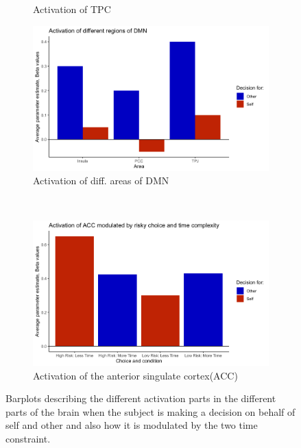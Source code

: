 \documentclass[11pt]{article}
\begin{document}
\begin{figure}
\begin{subfigure}[b]{0.4\textwidth}
    \caption{Activation of TPC                    }
    \label{fig:3c}
  \end{subfigure}
  \begin{subfigure}[b]{0.4\textwidth}
    \includegraphics[width=\textwidth]{figures/dmn.png}
    \caption{Activation of diff. areas of DMN}
    \label{fig:3d}
  \end{subfigure}\\
  \begin{subfigure}[b]{0.4\textwidth}
    \includegraphics[width=\textwidth]{figures/acc.png}
    \caption{Activation of the anterior singulate cortex(ACC)}
    \label{fig:3e}
  \end{subfigure}
  \caption{Barplots describing the different activation parts in the different parts of the brain when the subject is making a decision on behalf of self and other and also how it is modulated by the two time constraint.}
    
\end{figure}
\end{document}
